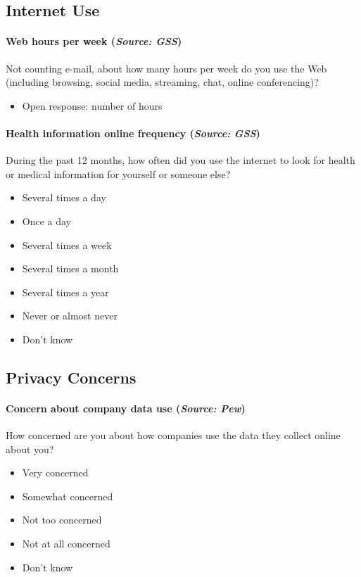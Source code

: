 \subsection{Internet Use}

\paragraph{Web hours per week (\textit{Source: GSS})}
Not counting e-mail, about how many hours per week do you use the Web (including browsing, social media, streaming, chat, online conferencing)?
\begin{itemize}[itemsep=-10pt,topsep=0pt]
\item Open response: number of hours
\end{itemize}

\paragraph{Health information online frequency (\textit{Source: GSS})}
During the past 12 months, how often did you use the internet to look for health or medical information for yourself or someone else?
\begin{itemize}[itemsep=-10pt,topsep=0pt]
\item Several times a day
\item Once a day
\item Several times a week
\item Several times a month
\item Several times a year
\item Never or almost never
\item Don’t know
\end{itemize}


\subsection{Privacy Concerns}

\paragraph{Concern about company data use (\textit{Source: Pew})}
How concerned are you about how companies use the data they collect online about you?
\begin{itemize}[itemsep=-10pt,topsep=0pt]
\item Very concerned
\item Somewhat concerned
\item Not too concerned
\item Not at all concerned
\item Don’t know
\end{itemize}

